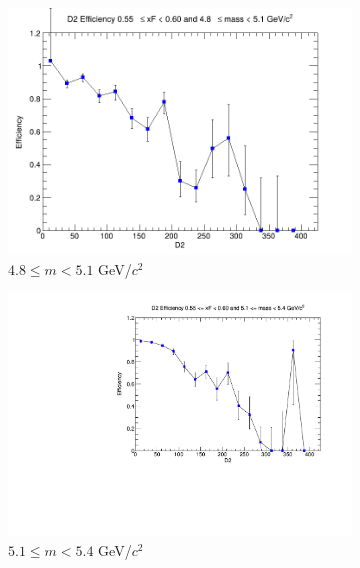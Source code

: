 \begin{figure}[p]
\begin{subfigure}[b]{0.32\textwidth}
        \centering
        \includegraphics[width=\textwidth]{./kTrackerEfficiencyPlots/D2_Efficiency_xF11_mass2.png}
        \caption{$4.8 \leq m < 5.1$ GeV/$c^2$}
        \label{fig:xF11_mass2}
    \end{subfigure}
    \vspace{0.5cm}
    \begin{subfigure}[b]{0.32\textwidth}
        \centering
        \includegraphics[width=\textwidth]{./kTrackerEfficiencyPlots/D2_Efficiency_xF11_mass3.pdf}
        \caption{$5.1 \leq m < 5.4$ GeV/$c^2$}
        \label{fig:xF11_mass3}
    \end{subfigure}
    \hfill
    \begin{subfigure}[b]{0.32\textwidth}
        \centering

\end{subfigure}
\end{figure}
